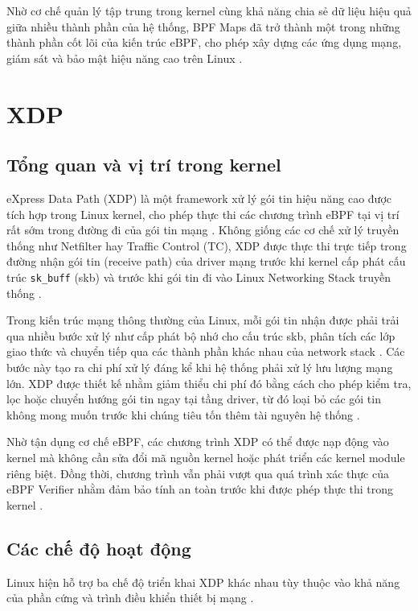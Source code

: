 \documentclass[../DoAn.tex]{subfiles}
\begin{document}
Nhờ cơ chế quản lý tập trung trong kernel cùng khả năng chia sẻ dữ liệu hiệu quả giữa nhiều thành phần của hệ thống, BPF Maps đã trở thành một trong những thành phần cốt lõi của kiến trúc eBPF, cho phép xây dựng các ứng dụng mạng, giám sát và bảo mật hiệu năng cao trên Linux \cite{linux_bpf_docs}.

\section{XDP}
\subsection{Tổng quan và vị trí trong kernel}
eXpress Data Path (XDP) là một framework xử lý gói tin hiệu năng cao được tích hợp trong Linux kernel, cho phép thực thi các chương trình eBPF tại vị trí rất sớm trong đường đi của gói tin mạng \cite{xdp_docs, castillonduperron2025ebpf}. Không giống các cơ chế xử lý truyền thống như Netfilter hay Traffic Control (TC), XDP được thực thi trực tiếp trong đường nhận gói tin (receive path) của driver mạng trước khi kernel cấp phát cấu trúc \texttt{sk\_buff} (skb) và trước khi gói tin đi vào Linux Networking Stack truyền thống \cite{xdp_docs, linux_skbuff}.

Trong kiến trúc mạng thông thường của Linux, mỗi gói tin nhận được phải trải qua nhiều bước xử lý như cấp phát bộ nhớ cho cấu trúc skb, phân tích các lớp giao thức và chuyển tiếp qua các thành phần khác nhau của network stack \cite{benvenuti2005linux}. Các bước này tạo ra chi phí xử lý đáng kể khi hệ thống phải xử lý lưu lượng mạng lớn. XDP được thiết kế nhằm giảm thiểu chi phí đó bằng cách cho phép kiểm tra, lọc hoặc chuyển hướng gói tin ngay tại tầng driver, từ đó loại bỏ các gói tin không mong muốn trước khi chúng tiêu tốn thêm tài nguyên hệ thống \cite{xdp_docs, cilium_bpf_docs}.

Nhờ tận dụng cơ chế eBPF, các chương trình XDP có thể được nạp động vào kernel mà không cần sửa đổi mã nguồn kernel hoặc phát triển các kernel module riêng biệt. Đồng thời, chương trình vẫn phải vượt qua quá trình xác thực của eBPF Verifier nhằm đảm bảo tính an toàn trước khi được phép thực thi trong kernel \cite{linux_bpf_docs, castillonduperron2025ebpf}.
\subsection{Các chế độ hoạt động}
Linux hiện hỗ trợ ba chế độ triển khai XDP khác nhau tùy thuộc vào khả năng của phần cứng và trình điều khiển thiết bị mạng \cite{xdp_docs, cilium_bpf_docs}.
\end{document}
